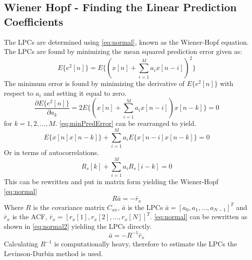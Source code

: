 \subsection{ Wiener Hopf - Finding the Linear Prediction Coefficients}
 The LPCs are determined using \autoref{eq:normal}, known as the Wiener-Hopf equation. The LPCs are found by minimizing the mean squared prediction error given as:
 \begin{equation}
 	E\{e^2[n]\}=E\{(x[n]+\sum_{i=1}^{M}a_ix[n-i] )^2\}
 \end{equation}
 The minimum error is found by minimizing the derivative of $E\{e^2[n]\}$ with respect to $a_i$ and setting it equal to zero. 
 \begin{equation}\label{eq:minPredError}
 \frac{\partial E\{e^2[n]\}}{\partial a_k} =2E\{(x[n]+\sum_{i=1}^{M}a_ix[n-i] )x[n-k]\}=0
 \end{equation}
 for $k = 1, 2, \dotsc, M$. \autoref{eq:minPredError} can be rearranged to yield.
 \begin{equation}
 	E\{x[n]x[n-k]\}+\sum_{i=1}^{M}a_iE\{x[n-i]x[n-k]\}=0
 \end{equation} 
 Or in terms of autocorrelations. 
 \begin{equation}
 R_s[k]+\sum_{i=1}^{M}a_iR_s[i-k]=0
 \end{equation} 
 This can be rewritten and put in matrix form yielding the Wiener-Hopf \autoref{eq:normal}
\begin{equation}\label{eq:normal}
R  \bar{a} = -\bar{r}_x
\end{equation}
Where $R$ is the covariance matrix $C_{xx}$, $\bar{a}$ is the LPCs $\bar{a} = [a_0 , a_1, \dots, a_{N-1}]^T$ and $\bar{r}_x$ is the ACF, $\bar{r}_x = [r_x[1] , r_x[2], \dotsc, r_x[N]]^T$. \autoref{eq:normal} can be rewritten as shown in \autoref{eq:normal2} yielding the LPCs directly.  
\begin{equation}\label{eq:normal2}
\bar{a} = -R^{-1} \bar{r}_x
\end{equation}
Calculating $R^{-1}$ is computationally heavy, therefore to estimate the LPCs the Levinson-Durbin method is used. 

